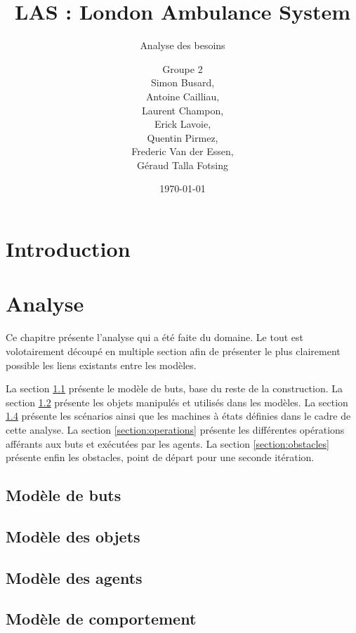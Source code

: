 \documentclass{report}
\title{LAS : London Ambulance System}
\subtitle{Analyse des besoins}
\author{\normalsize{Groupe 2}\\
\footnotesize{
Simon Busard, \\
Antoine Cailliau, \\
Laurent Champon,\\
Erick Lavoie, \\
Quentin Pirmez,\\
Frederic Van der Essen, \\
Géraud Talla Fotsing}}
\date{\today}
\begin{document}
\setlength{\parskip}{1em}

\maketitle
\setcounter{tocdepth}{1}
\tableofcontents

\chapter*{Introduction}
	
	
\chapter{Analyse}
	Ce chapitre présente l'analyse qui a été faite du domaine. Le tout est 
	volotairement découpé en multiple section afin de présenter le plus 
	clairement possible les liens existants entre les modèles. 
	
	La section \ref{section:buts} présente le modèle de buts, base du reste de 
	la construction.
	La section \ref{section:objets} présente les objets manipulés et utilisés 
	dans les modèles. La section \ref{section:comportement} présente
	les scénarios ainsi que les machines à états définies dans le cadre de
	cette analyse. 
	La section \ref{section:operations} présente les différentes opérations 
	afférants aux buts et exécutées par les agents.
	La section \ref{section:obstacles} présente enfin les obstacles, point
	de départ pour une seconde itération.
		
	\section{Modèle de buts}\label{section:buts}
		
		
	\section{Modèle des objets}\label{section:objets}
		

	\section{Modèle des agents}\label{section:agents}
		
		
	\section{Modèle de comportement}\label{section:comportement}
		
\end{document}
